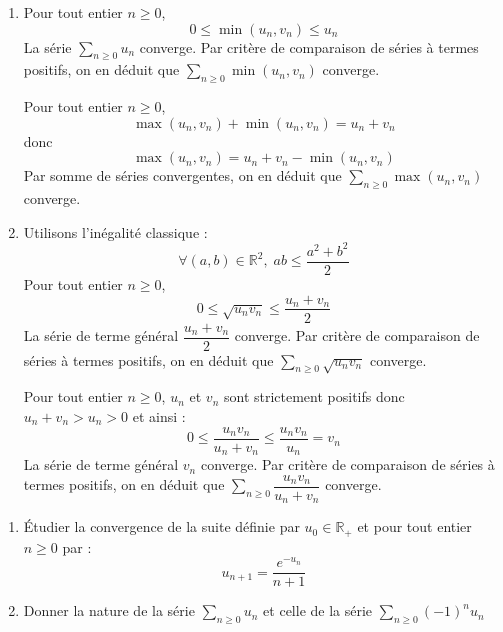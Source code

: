 \documentclass[a4paper,10pt]{report}
\newcommand{\Sum}[2]{\ensuremath{\textstyle{\sum\limits_{#1}^{#2}}}}
\begin{document}
\corr 

\begin{enumerate}
\item Pour tout entier $n \geq 0$,
$$ 0 \leq  \min(u_n,v_n) \leq u_n $$
La série $\Sum{n \geq 0}{} u_n$ converge. Par critère de comparaison de séries à termes positifs, on en déduit que $\Sum{n \geq 0}{} \min(u_n,v_n)$ converge. 

\medskip

\noindent Pour tout entier $n \geq 0$,
$$  \max(u_n,v_n) + \min(u_n,v_n) = u_n + v_n $$
donc 
$$ \max(u_n,v_n) =   u_n + v_n - \min(u_n,v_n)$$
Par somme de séries convergentes, on en déduit que $\Sum{n \geq 0}{} \max(u_n,v_n)$ converge.
\item Utilisons l'inégalité classique :
$$ \forall (a,b) \in \mathbb{R}^2, \; ab \leq \dfrac{a^2+b^2}{2}$$
Pour tout entier $n \geq 0$,
$$ 0 \leq \sqrt{u_n v_n} \leq \dfrac{u_n+ v_n}{2}$$
La série de terme général $\dfrac{u_n+ v_n}{2}$ converge. Par critère de comparaison de séries à termes positifs, on en déduit que $\Sum{n \geq 0}{} \sqrt{u_n v_n}$ converge. 

\medskip

\noindent Pour tout entier $n \geq 0$, $u_n$ et $v_n$ sont strictement positifs donc $u_n+v_n > u_n >0$ et ainsi :
$$ 0 \leq \dfrac{u_n v_n}{u_n+v_n} \leq \dfrac{u_n v_n}{u_n} = v_n$$
La série de terme général $v_n$ converge. Par critère de comparaison de séries à termes positifs, on en déduit que $\Sum{n \geq 0}{} \dfrac{u_n v_n}{u_n+v_n}$ converge. 
\end{enumerate}

\begin{Exa}  
\begin{enumerate}
\item Étudier la convergence de la suite définie par $u_0 \in \mathbb{R}_+$ et pour tout entier $n \geq 0$ par :
 \[
u_{n + 1} = \frac{e^{ - u_n}}{n + 1}
 \]
\item Donner la nature de la série $\Sum{n \geq 0}{} u_n$ et celle de la série $\Sum{n \geq 0}{} (-1)^n u_n$
\end{enumerate}
\end{Exa}

\corr 
\end{document}
